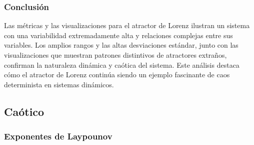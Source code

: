 \documentclass[11pt]{article}
\begin{document}
\hypertarget{conclusiuxf3n}{%
\subsubsection{Conclusión}\label{conclusiuxf3n}}

Las métricas y las visualizaciones para el atractor de Lorenz ilustran
un sistema con una variabilidad extremadamente alta y relaciones
complejas entre sus variables. Los amplios rangos y las altas
desviaciones estándar, junto con las visualizaciones que muestran
patrones distintivos de atractores extraños, confirman la naturaleza
dinámica y caótica del sistema. Este análisis destaca cómo el atractor
de Lorenz continúa siendo un ejemplo fascinante de caos determinista en
sistemas dinámicos.

    \hypertarget{cauxf3tico}{%
\subsection{Caótico}\label{cauxf3tico}}

    \hypertarget{exponentes-de-laypounov}{%
\subsubsection{Exponentes de Laypounov}\label{exponentes-de-laypounov}}
\end{document}
